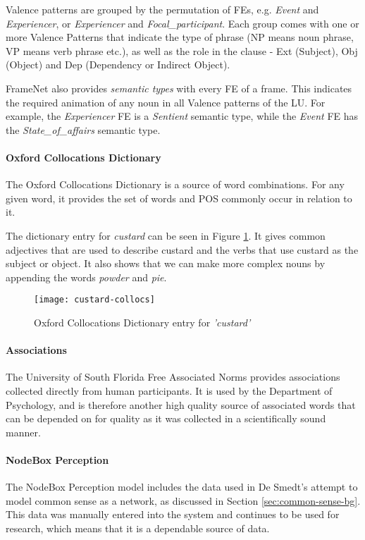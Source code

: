 Valence patterns are grouped by the permutation of FEs, e.g. \textit{Event} and \textit{Experiencer}, or \textit{Experiencer} and \textit{Focal\_participant}. Each group comes with one or more Valence Patterns that indicate the type of phrase (NP means noun phrase, VP means verb phrase etc.), as well as the role in the clause - Ext (Subject), Obj (Object) and Dep (Dependency or Indirect Object).

FrameNet also provides \textit{semantic types} with every FE of a frame. This indicates the required animation of any noun in all Valence patterns of the LU. For example, the \textit{Experiencer} FE is a \textit{Sentient} semantic type, while the \textit{Event} FE has the \textit{State\_of\_affairs} semantic type.

\paragraph{Oxford Collocations Dictionary}
\label{sec:ox-colloc}
The Oxford Collocations Dictionary\cite{crowther2003oxford} is a source of word combinations. For any given word, it provides the set of words and POS commonly occur in relation to it.

The dictionary entry for \textit{custard} can be seen in Figure \ref{fig:custard-collocs}. It gives common adjectives that are used to describe custard and the verbs that use custard as the subject or object. It also shows that we can make more complex nouns by appending the words \textit{powder} and \textit{pie}.

\begin{figure}[h!]
\centering
\texttt{[image: custard-collocs]}
\caption{Oxford Collocations Dictionary entry for \textit{'custard'}}
\label{fig:custard-collocs}
\end{figure}

\paragraph{Associations}
\label{sec:fl-assoc}
The University of South Florida Free Associated Norms\cite{nelson2004university} provides associations collected directly from human participants. It is used by the Department of Psychology, and is therefore another high quality source of associated words that can be depended on for quality as it was collected in a scientifically sound manner.


\paragraph{NodeBox Perception}
\label{sec:nb-percep}
The NodeBox Perception model includes the data used in De Smedt's attempt to model common sense as a network, as discussed in Section \ref{sec:common-sense-bg}. This data was manually entered into the system and continues to be used for research, which means that it is a dependable source of data. 

